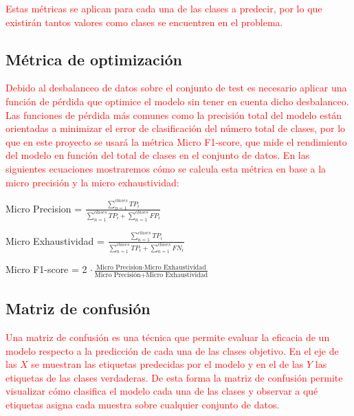         \textcolor{red}{Estas métricas se aplican para cada una de las clases a predecir, por lo que existirán tantos valores como clases se encuentren en el problema.}

        \subsection{Métrica de optimización}

            \textcolor{red}{Debido al desbalanceo de datos sobre el conjunto de test es necesario aplicar una función de pérdida que optimice el modelo sin tener en cuenta dicho desbalanceo. Las funciones de pérdida más comunes como la precisión total del modelo están orientadas a minimizar el error de clasificación del número total de clases, por lo que en este proyecto se usará la métrica Micro F1-score, que mide el rendimiento del modelo en función del total de clases en el conjunto de datos. En las siguientes ecuaciones mostraremos cómo se calcula esta métrica en base a la micro precisión y la micro exhaustividad:}

                \begin{center}
                    Micro Precision =  $\frac{ \sum_{n=1} ^ {clases} TP_i} {\sum_{n = 1} ^ {clases} TP_i + \sum_{n = 1} ^ {clases} FP_i}$
                \end{center}

                \begin{center}
                    Micro Exhaustividad = $\frac{ \sum_{n=1} ^ {clases} TP_i} {\sum_{n = 1} ^ {clases} TP_i + \sum_{n = 1} ^ {clases} FN_i}$
                \end{center}

                \begin{center}
                    Micro F1-score =  2 $\cdot \frac{\text{Micro Precision} \cdot \text{Micro Exhaustividad}} {\text{Micro Precisión} + \text{Micro Exhaustividad}}$
                \end{center}

        \subsection{Matriz de confusión}

        \textcolor{red}{Una matriz de confusión es una técnica que permite evaluar la eficacia de un modelo respecto a la predicción de cada una de las clases objetivo. En el eje de las $X$ se muestran las etiquetas predecidas por el modelo y en el de las $Y$ las etiquetas de las clases verdaderas. De esta forma la matriz de confusión permite visualizar cómo clasifica el modelo cada una de las clases y observar a qué etiquetas asigna cada muestra sobre cualquier conjunto de datos.}\\

